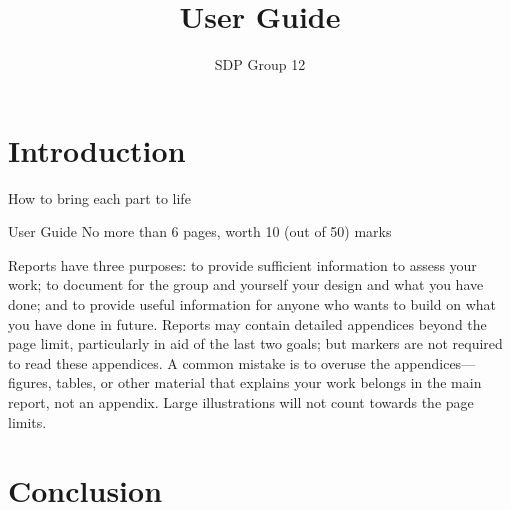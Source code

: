 \documentclass[12pt,a4paper]{article}
\author{SDP Group 12}
\title{User Guide}
\begin{document}
\maketitle

\section{Introduction}
How to bring each part to life

User Guide No more than 6 pages, worth 10 (out of 50) marks

Reports have three purposes: to provide sufficient information to assess your work; to
document for the group and yourself your design and what you have done; and to provide
useful information for anyone who wants to build on what you have done in future.
Reports may contain detailed appendices beyond the page limit, particularly in aid of the
last two goals; but markers are not required to read these appendices. A common mistake
is to overuse the appendices— figures, tables, or other material that explains your work
belongs in the main report, not an appendix. Large illustrations will not count towards
the page limits.








\section{Conclusion}
\end{document}
